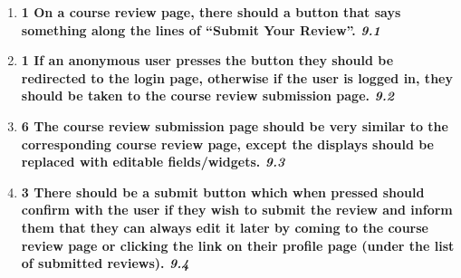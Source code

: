 \documentclass[12pt,titlepage]{article}
\newenvironment{storyPoint}
   {\color{blue} \bfseries}
   {}
\newenvironment{storyId}
   {\color{Bittersweet} \itshape}
   {}
\begin{document}
\newcommand{\storyNinePointOne}{
   \begin{storyPoint}1\end{storyPoint}
   On a course review page, there should a button that says something along the
   lines of ``Submit Your Review''.
   \begin{storyId}9.1\end{storyId}
}
\newcommand{\storyNinePointTwo}{
   \begin{storyPoint}1\end{storyPoint}
   If an anonymous user presses the button they should be redirected to the
   login page, otherwise if the user is logged in, they should be taken to the
   course review submission page.
   \begin{storyId}9.2\end{storyId}
}
\newcommand{\storyNinePointThree}{
   \begin{storyPoint}6\end{storyPoint}
   The course review submission page should be very similar to the corresponding
   course review page, except the displays should be replaced with editable
   fields/widgets.
   \begin{storyId}9.3\end{storyId}
}
\newcommand{\storyNinePointFour}{
   \begin{storyPoint}3\end{storyPoint}
   There should be a submit button which when pressed should confirm with the
   user if they wish to submit the review and inform them that they can always
   edit it later by coming to the course review page or clicking the link on
   their profile page (under the list of submitted reviews).
   \begin{storyId}9.4\end{storyId}
}

\begin{enumerate}
   \item \storyNinePointOne{}
   \item \storyNinePointTwo{}
   \item \storyNinePointThree{}
   \item \storyNinePointFour{}
\end{enumerate}

\subsection{\epicTen{}}

\newcommand{\storyTenPointOne}{
   \begin{storyPoint}2\end{storyPoint}
   If a logged in user has submitted a review for a course, the course review
   page should not contain a ``Submit Your Review'' button, but should instead
   contain a ``Edit Your Review'' page which should take them to the course
   review submission page, which contains all their previously saved work.
   \begin{storyId}10.1\end{storyId}
}
\end{document}
